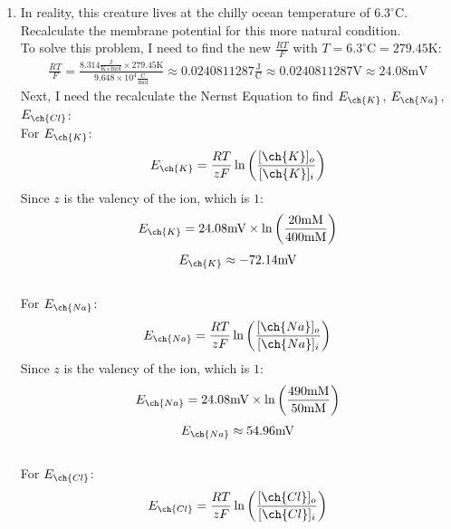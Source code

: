 \documentclass[11pt]{article}
\begin{document}
\begin{enumerate}[label=\arabic*.]
\begin{enumerate}[label=\alph*.]
\newpage
\item
In reality, this creature lives at the chilly ocean temperature of $6.3 ^{\circ}\text{C}$. Recalculate the membrane potential for this more natural condition. 
\vspace*{1\baselineskip}
\\
To solve this problem, I need to find the new $\frac{R T} {F}$ with $T = 6.3 ^{\circ}\text{C} = 279.45 \text{K}$:
\begin{align*}
\frac{R T} {F} = \frac{8.314 \frac{\text{J}} {\text{K} \times \text{mol}} \times 279.45 \text{K}} {9.648 \times 10 ^ 4 \frac{\text{C}} {\text{mol}}} \approx 0.0240811287 \frac{\text{J}} {\text{C}} \approx 0.0240811287 \text{V} \approx 24.08 \text{mV}
\end{align*}
Next, I need the recalculate the Nernst Equation to find $E_{\ch{K}}$, $E_{\ch{Na}}$, $E_{\ch{Cl}}$:
\vspace*{1\baselineskip}
\\
For $E_{\ch{K}}$:
\begin{align*}
E_{\ch{K}} = \frac{R T} {z F} \ln{\left(\frac{[\ch{K}]_o} {[\ch{K}]_i}\right)}
\end{align*}
Since $z$ is the valency of the  ion, which is $1$:
\begin{align*}
E_{\ch{K}} = 24.08 \text{mV} \times \ln{\left(\frac{20 \text{mM}} {400 \text{mM}}\right)}
\end{align*}
\begin{align*}
E_{\ch{K}} \approx -72.14 \text{mV}
\end{align*}
\vspace*{1\baselineskip}
\\
For $E_{\ch{Na}}$:
\begin{align*}
E_{\ch{Na}} = \frac{R T} {z F} \ln{\left(\frac{[\ch{Na}]_o} {[\ch{Na}]_i}\right)}
\end{align*}
Since $z$ is the valency of the  ion, which is $1$:
\begin{align*}
E_{\ch{Na}} = 24.08 \text{mV} \times \ln{\left(\frac{490 \text{mM}} {50 \text{mM}}\right)}
\end{align*}
\begin{align*}
E_{\ch{Na}} \approx 54.96 \text{mV}
\end{align*}
\vspace*{1\baselineskip}
\\
For $E_{\ch{Cl}}$:
\begin{align*}
E_{\ch{Cl}} = \frac{R T} {z F} \ln{\left(\frac{[\ch{Cl}]_o} {[\ch{Cl}]_i}\right)}
\end{align*}

\end{enumerate}
\end{enumerate}
\end{document}

